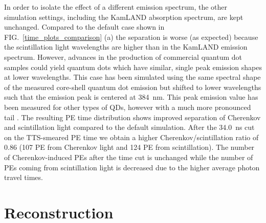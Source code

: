 \documentclass[aps,prc,twocolumn,groupedaddress,showpacs,amsmath,amssymb,floatfix,superscriptaddress]{revtex4}
\begin{document}
In order to isolate the effect of a different emission spectrum, the
other simulation settings, including the KamLAND absorption spectrum,
are kept unchanged. Compared to the default case shown in
FIG.~\ref{time_plots_comparison} (a) the separation is worse (as
expected) because the scintillation light wavelengths are higher than
in the KamLAND emission spectrum. However, advances in the production
of commercial quantum dot samples could yield quantum dots which have
similar, single peak emission shapes at lower wavelengths. This case
has been simulated using the same spectral shape of the measured
core-shell quantum dot emission but shifted to lower wavelengths such
that the emission peak is centered at 384~nm. This peak emission value
has been measured for other types of QDs, however with a much more
pronounced tail \cite{qdot2}. The resulting PE time distribution shows
improved separation of Cherenkov and scintillation light compared to
the default simulation. After the 34.0~ns cut on the TTS-smeared PE
time we obtain a higher Cherenkov/scintillation ratio of 0.86 (107 PE
from Cherenkov light and 124 PE from scintillation). The number of
Cherenkov-induced PEs after the time cut is unchanged while the number
of PEs coming from scintillation light is decreased due to the higher
average photon travel times.

\section{Reconstruction}
\label{reconstruction_sec}
\end{document}
